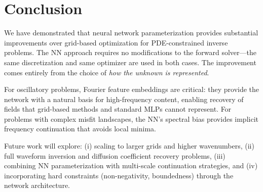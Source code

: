 \documentclass[11pt]{article}
\begin{document}
\section{Conclusion}
\label{sec:conclusion}

We have demonstrated that neural network parameterization provides substantial improvements over grid-based optimization for PDE-constrained inverse problems. The NN approach requires no modifications to the forward solver---the same discretization and same optimizer are used in both cases. The improvement comes entirely from the choice of \emph{how the unknown is represented}.

For oscillatory problems, Fourier feature embeddings are critical: they provide the network with a natural basis for high-frequency content, enabling recovery of fields that grid-based methods and standard MLPs cannot represent. For problems with complex misfit landscapes, the NN's spectral bias provides implicit frequency continuation that avoids local minima.

Future work will explore: (i) scaling to larger grids and higher wavenumbers, (ii) full waveform inversion and diffusion coefficient recovery problems, (iii) combining NN parameterization with multi-scale continuation strategies, and (iv) incorporating hard constraints (non-negativity, boundedness) through the network architecture.




\end{document}
